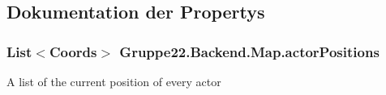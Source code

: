 \subsection{Dokumentation der Propertys}
\hypertarget{class_gruppe22_1_1_backend_1_1_map_a186af3927e65a77740f619513dd2c60a}{
\subsubsection[{actor\-Positions}]{\setlength{\rightskip}{0pt plus 5cm}List$<${\bf Coords}$>$ Gruppe22.\-Backend.\-Map.\-actor\-Positions\hspace{0.3cm}{\ttfamily [get]}}}\label{class_gruppe22_1_1_backend_1_1_map_a186af3927e65a77740f619513dd2c60a}


A list of the current position of every actor 

